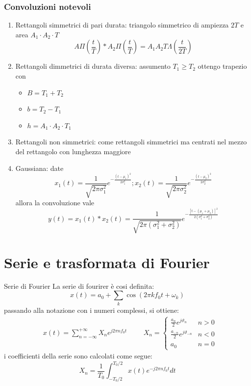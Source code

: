 \subsubsection*{Convoluzioni notevoli}
\begin{enumerate}
	\item Rettangoli simmetrici di pari durata: triangolo simmetrico di ampiezza  $ 2T $ e area $ A_1 \cdot  A_2 \cdot T $
	      \[
		      A \Pi \left(\frac{t}{T}\right) * A_2 \Pi \left(\frac{t}{T}\right) = A_1A_2T \Lambda \left(\frac{t}{2T}\right)
	      \]
	\item Rettangoli dimmetrici di durata diversa: assumento $ T_1 \ge T_2 $ ottengo trapezio con
	      \begin{itemize}
		      \item $ B = T_1  + T_2 $
		      \item  $ b = T_2 - T_1 $
		      \item  $ h = A_1 \cdot A_2 \cdot  T_1 $
	      \end{itemize}
	\item Rettangoli non simmetrici: come rettangoli simmetrici ma centrati nel mezzo del rettangolo con lunghezza maggiore
	\item Gaussiana: date
	      \[
		      x_1(t)=\frac{1}{\sqrt{2 \pi \sigma_1^2}} e^{-\frac{\left(t-\mu_1\right)^2}{2 \sigma_1^2}} ; x_2(t)=\frac{1}{\sqrt{2 \pi \sigma_2^2}} e^{-\frac{\left(t-\mu_2\right)^2}{2 \sigma_2^2}}
	      \]
	      allora la convoluzione vale
	      \[
		      y(t)=x_1(t) * x_2(t)=\frac{1}{\sqrt{2 \pi\left(\sigma_1^2+\sigma_2^2\right)}} e^{-\frac{\left[t-\left(\mu_1+\mu_2\right)\right]^2}{2\left(\sigma_1^2+\sigma_2^2\right)}}
	      \]
\end{enumerate}
\section{Serie e trasformata di Fourier}

\begin{definizione}{Serie di Fourier}
	La serie di fourirer è cosi definita:
	\[
		x\left(t\right) = a_0 + \sum_{k} \cos \left(2 \pi k f_0 t + \omega_k  \right)
	\]
	passando alla notazione con i numeri complessi, si ottiene:
	\begin{align*}
		 & x(t)=\sum_{n=-\infty}^{+\infty} X_n e^{j 2 \pi n f_0 t} &  &
		 & X_n=
		\begin{cases}
			\frac{a_n}{2} e^{j \vartheta_n}       & n>0 \\
			\frac{a_{-n}}{2} e^{j \vartheta_{-n}} & n<0 \\
			a_0                                   & n=0
		\end{cases}
	\end{align*}
	i coefficienti della serie sono calcolati come segue:
	\[
		X_n=\frac{1}{T_0} \int_{-T_0 / 2}^{T_0 / 2} x(t) e^{-j 2 \pi n f_0 t} d t
	\]
\end{definizione}

